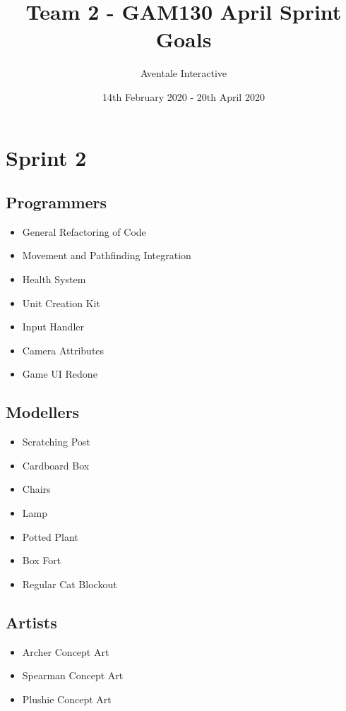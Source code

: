 \documentclass{article}
\title{Team 2 - GAM130 April Sprint Goals}
\author{Aventale Interactive}
\date{14th February 2020 - 20th April 2020}
\begin{document}
\maketitle

\newpage
\section{Sprint 2}
\subsection{Programmers}
\begin{itemize}
    \item General Refactoring of Code
    \item Movement and Pathfinding Integration
    \item Health System
    \item Unit Creation Kit
    \item Input Handler
    \item Camera Attributes
    \item Game UI Redone
\end{itemize}

\subsection{Modellers}
\begin{itemize}
    \item Scratching Post
    \item Cardboard Box
    \item Chairs
    \item Lamp
    \item Potted Plant
    \item Box Fort
    \item Regular Cat Blockout
\end{itemize}

\subsection{Artists}
\begin{itemize}
    \item Archer Concept Art
    \item Spearman Concept Art
    \item Plushie Concept Art
\end{itemize}
\end{document}
